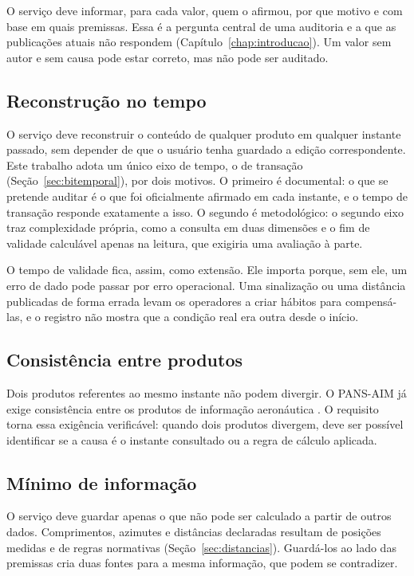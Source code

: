 O serviço deve informar, para cada valor, quem o afirmou, por que motivo e com base em quais premissas. Essa é a pergunta central de uma auditoria e a que as publicações atuais não respondem (Capítulo~\ref{chap:introducao}). Um valor sem autor e sem causa pode estar correto, mas não pode ser auditado.

\subsection{Reconstrução no tempo}\label{sec:req-tempo}

O serviço deve reconstruir o conteúdo de qualquer produto em qualquer instante passado, sem depender de que o usuário tenha guardado a edição correspondente. Este trabalho adota um único eixo de tempo, o de transação (Seção~\ref{sec:bitemporal}), por dois motivos. O primeiro é documental: o que se pretende auditar é o que foi oficialmente afirmado em cada instante, e o tempo de transação responde exatamente a isso. O segundo é metodológico: o segundo eixo traz complexidade própria, como a consulta em duas dimensões e o fim de validade calculável apenas na leitura, que exigiria uma avaliação à parte.

O tempo de validade fica, assim, como extensão. Ele importa porque, sem ele, um erro de dado pode passar por erro operacional. Uma sinalização ou uma distância publicadas de forma errada levam os operadores a criar hábitos para compensá-las, e o registro não mostra que a condição real era outra desde o início.

\subsection{Consistência entre produtos}\label{sec:req-consistencia}

Dois produtos referentes ao mesmo instante não podem divergir. O PANS-AIM já exige consistência entre os produtos de informação aeronáutica \cite{icao2018pansaim}. O requisito torna essa exigência verificável: quando dois produtos divergem, deve ser possível identificar se a causa é o instante consultado ou a regra de cálculo aplicada.

\subsection{Mínimo de informação}\label{sec:req-minimo}

O serviço deve guardar apenas o que não pode ser calculado a partir de outros dados. Comprimentos, azimutes e distâncias declaradas resultam de posições medidas e de regras normativas (Seção~\ref{sec:distancias}). Guardá-los ao lado das premissas cria duas fontes para a mesma informação, que podem se contradizer.

